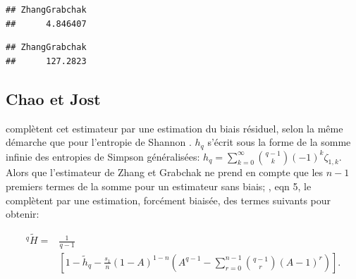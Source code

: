 \documentclass[
  11pt,
  french,
  a4paper,
  extrafontsizes,onecolumn,openright
  ]{memoir}
\newenvironment{Shaded}{\begin{snugshade}}{\end{snugshade}}
\newcommand{\AttributeTok}[1]{\textcolor[rgb]{0.13,0.29,0.53}{#1}}
\newcommand{\DecValTok}[1]{\textcolor[rgb]{0.00,0.00,0.81}{#1}}
\newcommand{\FunctionTok}[1]{\textcolor[rgb]{0.13,0.29,0.53}{\textbf{#1}}}
\newcommand{\NormalTok}[1]{#1}
\newcommand{\SpecialCharTok}[1]{\textcolor[rgb]{0.81,0.36,0.00}{\textbf{#1}}}
\newcommand{\StringTok}[1]{\textcolor[rgb]{0.31,0.60,0.02}{#1}}
\begin{document}
\scriptsize

\begin{Shaded}
\end{Shaded}

\begin{verbatim}
## ZhangGrabchak 
##      4.846407
\end{verbatim}

\begin{Shaded}
\end{Shaded}

\begin{verbatim}
## ZhangGrabchak 
##      127.2823
\end{verbatim}

\normalsize

\subsection{Chao et Jost}\label{sec-BiaisHCDT}

\textcite{Chao2015} complètent cet estimateur par une estimation du biais résiduel, selon la même démarche que pour l'entropie de Shannon \autocite{Chao2013}.
\(h_q\) s'écrit sous la forme de la somme infinie des entropies de Simpson généralisées: \(h_q = \sum_{k=0}^{\infty}{\binom{q-1}{k}(-1)^k\zeta_{1,k}}\).
Alors que l'estimateur de Zhang et Grabchak ne prend en compte que les \(n-1\) premiers termes de la somme pour un estimateur sans biais; \textcite{Chao2015}, eqn 5, le complètent par une estimation, forcément biaisée, des termes suivants pour obtenir:

\begin{align}
  \label{eq:HqChaoJost}
  ^q\!{\tilde{H}} = 
  &\frac{1}{q-1} \\
  &\left[ 1 -\tilde{h}_q -\frac{s_{1}}{n} {\left( 1-A \right)}^{1-n} \left( A^{q-1} -\sum^{n-1}_{r=0}{ \binom{q-1}{r} {\left(A-1\right)}^r} \right) \right].
\end{align}
\end{document}
